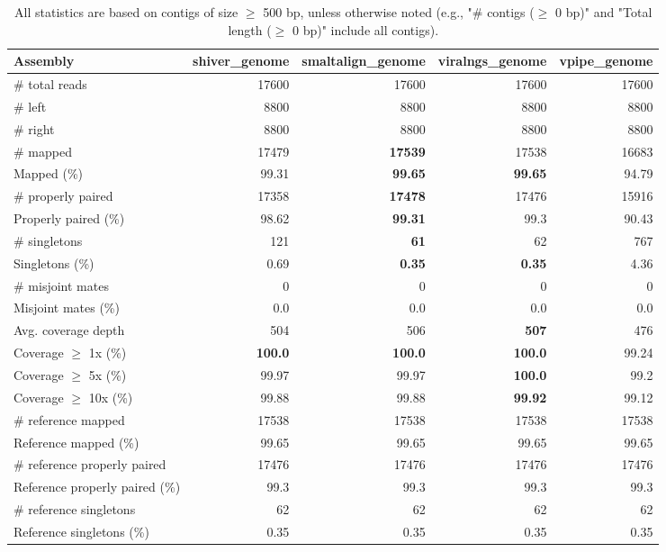 \documentclass[12pt,a4paper]{article}
\begin{document}
\begin{table}[ht]
\begin{center}
\caption{All statistics are based on contigs of size $\geq$ 500 bp, unless otherwise noted (e.g., "\# contigs ($\geq$ 0 bp)" and "Total length ($\geq$ 0 bp)" include all contigs).}
\begin{tabular}{|l*{4}{|r}|}
\hline
Assembly & shiver\_genome & smaltalign\_genome & viralngs\_genome & vpipe\_genome \\ \hline
\# total reads & 17600 & 17600 & 17600 & 17600 \\ \hline
\# left & 8800 & 8800 & 8800 & 8800 \\ \hline
\# right & 8800 & 8800 & 8800 & 8800 \\ \hline
\# mapped & 17479 & {\bf 17539} & 17538 & 16683 \\ \hline
Mapped (\%) & 99.31 & {\bf 99.65} & {\bf 99.65} & 94.79 \\ \hline
\# properly paired & 17358 & {\bf 17478} & 17476 & 15916 \\ \hline
Properly paired (\%) & 98.62 & {\bf 99.31} & 99.3 & 90.43 \\ \hline
\# singletons & 121 & {\bf 61} & 62 & 767 \\ \hline
Singletons (\%) & 0.69 & {\bf 0.35} & {\bf 0.35} & 4.36 \\ \hline
\# misjoint mates & 0 & 0 & 0 & 0 \\ \hline
Misjoint mates (\%) & 0.0 & 0.0 & 0.0 & 0.0 \\ \hline
Avg. coverage depth & 504 & 506 & {\bf 507} & 476 \\ \hline
Coverage $\geq$ 1x (\%) & {\bf 100.0} & {\bf 100.0} & {\bf 100.0} & 99.24 \\ \hline
Coverage $\geq$ 5x (\%) & 99.97 & 99.97 & {\bf 100.0} & 99.2 \\ \hline
Coverage $\geq$ 10x (\%) & 99.88 & 99.88 & {\bf 99.92} & 99.12 \\ \hline
\# reference mapped & 17538 & 17538 & 17538 & 17538 \\ \hline
Reference mapped (\%) & 99.65 & 99.65 & 99.65 & 99.65 \\ \hline
\# reference properly paired & 17476 & 17476 & 17476 & 17476 \\ \hline
Reference properly paired (\%) & 99.3 & 99.3 & 99.3 & 99.3 \\ \hline
\# reference singletons & 62 & 62 & 62 & 62 \\ \hline
Reference singletons (\%) & 0.35 & 0.35 & 0.35 & 0.35 \\ \hline

\end{tabular}
\end{center}
\end{table}
\end{document}
